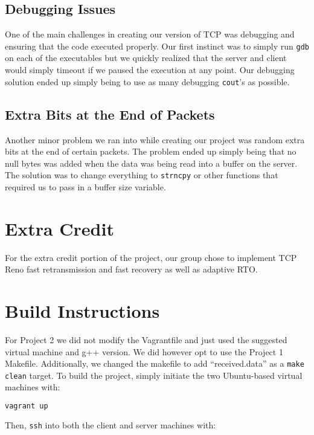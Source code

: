 \documentclass{article}
\begin{document}
\subsection{Debugging Issues}

One of the main challenges in creating our version of TCP was debugging and ensuring that the code executed properly. Our first instinct was to simply run \texttt{gdb} on each of the executables but we quickly realized that the server and client would simply timeout if we paused the execution at any point. Our debugging solution ended up simply being to use as many debugging \texttt{cout}'s as possible.

\subsection{Extra Bits at the End of Packets}

Another minor problem we ran into while creating our project was random extra bits at the end of certain packets. The problem ended up simply being that no null bytes was added when the data was being read into a buffer on the server. The solution was to change everything to \texttt{strncpy} or other functions that required us to pass in a buffer size variable.

\section{Extra Credit}

For the extra credit portion of the project, our group chose to implement TCP Reno fast retransmission and fast recovery as well as adaptive RTO.

\section{Build Instructions}

For Project 2 we did not modify the Vagrantfile and just used the suggested virtual machine and g++ version. We did however opt to use the Project 1 Makefile. Additionally, we changed the makefile to add ``received.data'' as a \texttt{make clean} target. To build the project, simply initiate the two Ubuntu-based virtual machines with:

\begin{lstlisting}[language=bash]
vagrant up
\end{lstlisting} 

\noindent
Then, \texttt{ssh} into both the client and server machines with:
\end{document}
